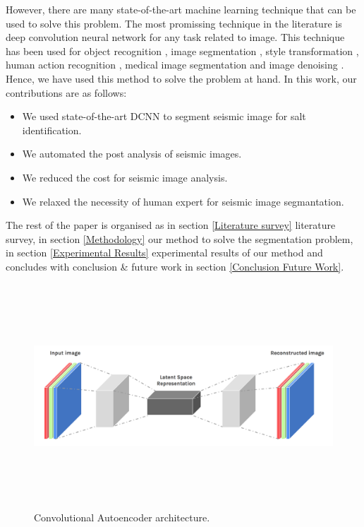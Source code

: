 \documentclass[conference]{IEEEtran}
\begin{document}
However, there are many state-of-the-art machine learning technique that can be used to solve this problem. The most promissing technique in the literature is deep convolution neural network for any task related to image. This technique has been used for object recognition \cite{ren2015faster}, image segmentation \cite{chen2018deeplab}, style transformation \cite{etemad20093d}, human action recognition \cite{ji20133d}, medical image segmentation \cite{milletari2016v} and image denoising \cite{zhang2017beyond}. Hence, we have used this method to solve the problem at hand. In this work, our contributions are as follows:

\begin{itemize}
	\item We used state-of-the-art DCNN to segment seismic image for salt identification.
	\item We automated the post analysis of seismic images.
	\item We reduced the cost for seismic image analysis.
	\item We relaxed the necessity of human expert for seismic image segmantation.
\end{itemize}

The rest of the paper is organised as in section \ref{Literature survey} literature survey, in section \ref{Methodology} our method to solve the segmentation problem, in section \ref{Experimental Results} experimental results of our method and concludes with conclusion \& future work in section \ref{Conclusion Future Work}.

\begin{figure}[!t]
	\centerline{\includegraphics[width=7in, height=3.3in]{auto_encoder_architecture}}
	\caption{Convolutional Autoencoder architecture.\cite{autoencoder}}
	\label{fig:CAE}
\end{figure}
\end{document}
